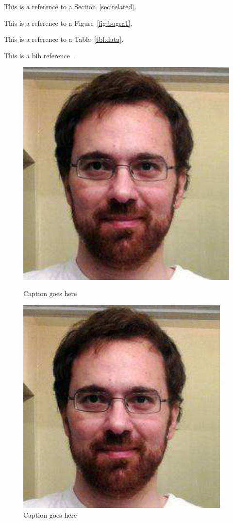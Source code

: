 This is a reference to a Section~\ref{sec:related}.

This is a reference to a Figure~\ref{fig:bugra1}.

This is a reference to a Table~\ref{tbl:data}.

This is a bib reference~\cite{ref:SPL}.

\begin{figure}[t]
\centering
\begin{minipage}{0.48\linewidth}
  \centering
  \includegraphics[width=0.5\linewidth]{figures/bugra.eps}
  \caption{Caption goes here}\label{fig:bugra1}
\end{minipage}
\vspace{0.01\linewidth}
\begin{minipage}{0.48\linewidth}
  \centering
  \includegraphics[width=0.5\linewidth]{figures/bugra.pdf}
  \caption{Caption goes here}\label{fig:bugra2}  
\end{minipage}
\end{figure}


